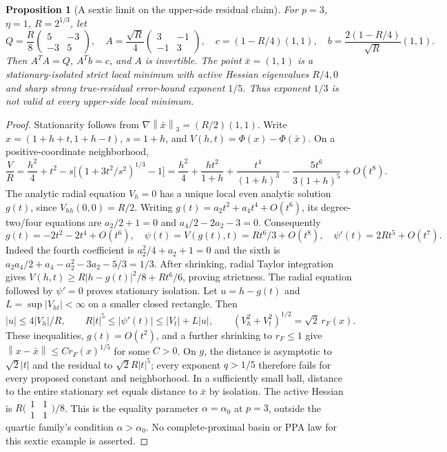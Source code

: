 \documentclass[11pt]{article}
\newcommand{\norm}[1]{\left\lVert#1\right\rVert}
\newtheorem{proposition}[theorem]{Proposition}
\theoremstyle{remark}\newtheorem{remark}[theorem]{Remark}
\begin{document}
\begin{proposition}[A sextic limit on the upper-side residual claim]
\label{prop:sextic}
For $p=3$, $\eta=1$, $R=2^{1/3}$, let
\[
 Q=\frac R8\begin{pmatrix}5&-3\\-3&5\end{pmatrix},\quad
 A=\frac{\sqrt R}{4}\begin{pmatrix}3&-1\\-1&3\end{pmatrix},\quad
 c=(1-R/4)(1,1),\quad b=\frac{2(1-R/4)}{\sqrt R}(1,1).
\]
Then $A^TA=Q$, $A^Tb=c$, and $A$ is invertible.
The point $\bar x=(1,1)$ is a stationary-isolated strict local minimum
with active Hessian eigenvalues $R/4,0$ and sharp strong true-residual
error-bound exponent $1/5$. Thus exponent $1/3$ is not valid at
every upper-side local minimum.
\end{proposition}
\begin{proof}
Stationarity follows from $\nabla\norm{\bar x}_3=(R/2)(1,1)$.
Write $x=(1+h+t,1+h-t)$, $s=1+h$, and
$V(h,t)=\Phi(x)-\Phi(\bar x)$. On a positive-coordinate neighborhood,
\[
 \frac VR=\frac{h^2}{4}+t^2-s\bigl[(1+3t^2/s^2)^{1/3}-1\bigr]
 =\frac{h^2}{4}+\frac{ht^2}{1+h}+\frac{t^4}{(1+h)^3}
 -\frac{5t^6}{3(1+h)^5}+O(t^8).
\]
The analytic radial equation $V_h=0$ has a unique local even analytic
solution $g(t)$, since $V_{hh}(0,0)=R/2$.
Writing $g(t)=a_2t^2+a_4t^4+O(t^6)$, its degree-two/four equations are
$a_2/2+1=0$ and $a_4/2-2a_2-3=0$. Consequently
\[
 g(t)=-2t^2-2t^4+O(t^6),\quad
 \psi(t)=V(g(t),t)=Rt^6/3+O(t^8),\quad
 \psi'(t)=2Rt^5+O(t^7).
\]
Indeed the fourth coefficient is $a_2^2/4+a_2+1=0$ and the sixth
is $a_2a_4/2+a_4-a_2^2-3a_2-5/3=1/3$.
After shrinking, radial Taylor integration gives
$V(h,t)\ge R|h-g(t)|^2/8+Rt^6/6$, proving strictness.
The radial equation followed by $\psi'=0$ proves stationary isolation.
Let $u=h-g(t)$ and $L=\sup|V_{ht}|<\infty$ on a smaller closed rectangle.
Then
\[
 |u|\le4|V_h|/R,\qquad R|t|^5\le|\psi'(t)|
 \le |V_t|+L|u|,\qquad
 (V_h^2+V_t^2)^{1/2}=\sqrt2\,r_F(x).
\]
These inequalities, $g(t)=O(t^2)$, and a further shrinking to
$r_F\le1$ give $\norm{x-\bar x}\le C r_F(x)^{1/5}$ for some $C>0$.
On $g$, the distance is asymptotic to $\sqrt2|t|$ and the residual
to $\sqrt2 R|t|^5$; every exponent $q>1/5$ therefore fails
for every proposed constant and neighborhood.
In a sufficiently small ball, distance to the entire stationary set
equals distance to $\bar x$ by isolation.
The active Hessian is $R\bigl(\begin{smallmatrix}1&1\\1&1\end{smallmatrix}\bigr)/8$.
This is the equality parameter $\alpha=\alpha_0$ at $p=3$,
outside the quartic family's condition $\alpha>\alpha_0$.
No complete-proximal basin or PPA law for this sextic example is asserted.
\end{proof}
\end{document}
